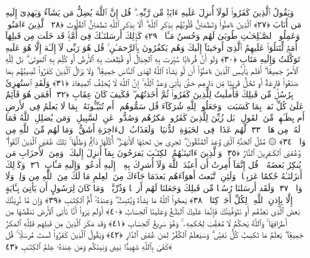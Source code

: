  وَيَقُولُ ٱلَّذِينَ كَفَرُوا۟ لَولَآ أُنزِلَ عَلَيهِ ءَايَةٌۭ مِّن رَّبِّهِۦ ۗ قُل إِنَّ ٱللَّهَ يُضِلُّ مَن يَشَآءُ وَيَهدِىٓ إِلَيهِ مَن أَنَابَ ﴿٢٧﴾
 ٱلَّذِينَ ءَامَنُوا۟ وَتَطمَئِنُّ قُلُوبُهُم بِذِكرِ ٱللَّهِ ۗ أَلَا بِذِكرِ ٱللَّهِ تَطمَئِنُّ ٱلقُلُوبُ ﴿٢٨﴾
 ٱلَّذِينَ ءَامَنُوا۟ وَعَمِلُوا۟ ٱلصَّـٰلِحَـٰتِ طُوبَىٰ لَهُم وَحُسنُ مَـَٔابٍۢ ﴿٢٩﴾
 كَذَٟلِكَ أَرسَلنَـٰكَ فِىٓ أُمَّةٍۢ قَد خَلَت مِن قَبلِهَآ أُمَمٌۭ لِّتَتلُوَا۟ عَلَيهِمُ ٱلَّذِىٓ أَوحَينَآ إِلَيكَ وَهُم يَكفُرُونَ بِٱلرَّحمَـٰنِ ۚ قُل هُوَ رَبِّى لَآ إِلَـٰهَ إِلَّا هُوَ عَلَيهِ تَوَكَّلتُ وَإِلَيهِ مَتَابِ ﴿٣٠﴾
 وَلَو أَنَّ قُرءَانًۭا سُيِّرَت بِهِ ٱلجِبَالُ أَو قُطِّعَت بِهِ ٱلأَرضُ أَو كُلِّمَ بِهِ ٱلمَوتَىٰ ۗ بَل لِّلَّهِ ٱلأَمرُ جَمِيعًا ۗ أَفَلَم يَا۟يـَٔسِ ٱلَّذِينَ ءَامَنُوٓا۟ أَن لَّو يَشَآءُ ٱللَّهُ لَهَدَى ٱلنَّاسَ جَمِيعًۭا ۗ وَلَا يَزَالُ ٱلَّذِينَ كَفَرُوا۟ تُصِيبُهُم بِمَا صَنَعُوا۟ قَارِعَةٌ أَو تَحُلُّ قَرِيبًۭا مِّن دَارِهِم حَتَّىٰ يَأتِىَ وَعدُ ٱللَّهِ ۚ إِنَّ ٱللَّهَ لَا يُخلِفُ ٱلمِيعَادَ ﴿٣١﴾
 وَلَقَدِ ٱستُهزِئَ بِرُسُلٍۢ مِّن قَبلِكَ فَأَملَيتُ لِلَّذِينَ كَفَرُوا۟ ثُمَّ أَخَذتُهُم ۖ فَكَيفَ كَانَ عِقَابِ ﴿٣٢﴾
 أَفَمَن هُوَ قَآئِمٌ عَلَىٰ كُلِّ نَفسٍۭ بِمَا كَسَبَت ۗ وَجَعَلُوا۟ لِلَّهِ شُرَكَآءَ قُل سَمُّوهُم ۚ أَم تُنَبِّـُٔونَهُۥ بِمَا لَا يَعلَمُ فِى ٱلأَرضِ أَم بِظَـٰهِرٍۢ مِّنَ ٱلقَولِ ۗ بَل زُيِّنَ لِلَّذِينَ كَفَرُوا۟ مَكرُهُم وَصُدُّوا۟ عَنِ ٱلسَّبِيلِ ۗ وَمَن يُضلِلِ ٱللَّهُ فَمَا لَهُۥ مِن هَادٍۢ ﴿٣٣﴾
 لَّهُم عَذَابٌۭ فِى ٱلحَيَوٰةِ ٱلدُّنيَا ۖ وَلَعَذَابُ ٱلءَاخِرَةِ أَشَقُّ ۖ وَمَا لَهُم مِّنَ ٱللَّهِ مِن وَاقٍۢ ﴿٣٤﴾
 ۞ مَّثَلُ ٱلجَنَّةِ ٱلَّتِى وُعِدَ ٱلمُتَّقُونَ ۖ تَجرِى مِن تَحتِهَا ٱلأَنهَـٰرُ ۖ أُكُلُهَا دَآئِمٌۭ وَظِلُّهَا ۚ تِلكَ عُقبَى ٱلَّذِينَ ٱتَّقَوا۟ ۖ وَّعُقبَى ٱلكَـٰفِرِينَ ٱلنَّارُ ﴿٣٥﴾
 وَٱلَّذِينَ ءَاتَينَـٰهُمُ ٱلكِتَـٰبَ يَفرَحُونَ بِمَآ أُنزِلَ إِلَيكَ ۖ وَمِنَ ٱلأَحزَابِ مَن يُنكِرُ بَعضَهُۥ ۚ قُل إِنَّمَآ أُمِرتُ أَن أَعبُدَ ٱللَّهَ وَلَآ أُشرِكَ بِهِۦٓ ۚ إِلَيهِ أَدعُوا۟ وَإِلَيهِ مَـَٔابِ ﴿٣٦﴾
 وَكَذَٟلِكَ أَنزَلنَـٰهُ حُكمًا عَرَبِيًّۭا ۚ وَلَئِنِ ٱتَّبَعتَ أَهوَآءَهُم بَعدَمَا جَآءَكَ مِنَ ٱلعِلمِ مَا لَكَ مِنَ ٱللَّهِ مِن وَلِىٍّۢ وَلَا وَاقٍۢ ﴿٣٧﴾
 وَلَقَد أَرسَلنَا رُسُلًۭا مِّن قَبلِكَ وَجَعَلنَا لَهُم أَزوَٟجًۭا وَذُرِّيَّةًۭ ۚ وَمَا كَانَ لِرَسُولٍ أَن يَأتِىَ بِـَٔايَةٍ إِلَّا بِإِذنِ ٱللَّهِ ۗ لِكُلِّ أَجَلٍۢ كِتَابٌۭ ﴿٣٨﴾
 يَمحُوا۟ ٱللَّهُ مَا يَشَآءُ وَيُثبِتُ ۖ وَعِندَهُۥٓ أُمُّ ٱلكِتَـٰبِ ﴿٣٩﴾
 وَإِن مَّا نُرِيَنَّكَ بَعضَ ٱلَّذِى نَعِدُهُم أَو نَتَوَفَّيَنَّكَ فَإِنَّمَا عَلَيكَ ٱلبَلَـٰغُ وَعَلَينَا ٱلحِسَابُ ﴿٤٠﴾
 أَوَلَم يَرَوا۟ أَنَّا نَأتِى ٱلأَرضَ نَنقُصُهَا مِن أَطرَافِهَا ۚ وَٱللَّهُ يَحكُمُ لَا مُعَقِّبَ لِحُكمِهِۦ ۚ وَهُوَ سَرِيعُ ٱلحِسَابِ ﴿٤١﴾
 وَقَد مَكَرَ ٱلَّذِينَ مِن قَبلِهِم فَلِلَّهِ ٱلمَكرُ جَمِيعًۭا ۖ يَعلَمُ مَا تَكسِبُ كُلُّ نَفسٍۢ ۗ وَسَيَعلَمُ ٱلكُفَّٰرُ لِمَن عُقبَى ٱلدَّارِ ﴿٤٢﴾
 وَيَقُولُ ٱلَّذِينَ كَفَرُوا۟ لَستَ مُرسَلًۭا ۚ قُل كَفَىٰ بِٱللَّهِ شَهِيدًۢا بَينِى وَبَينَكُم وَمَن عِندَهُۥ عِلمُ ٱلكِتَـٰبِ ﴿٤٣﴾
 

